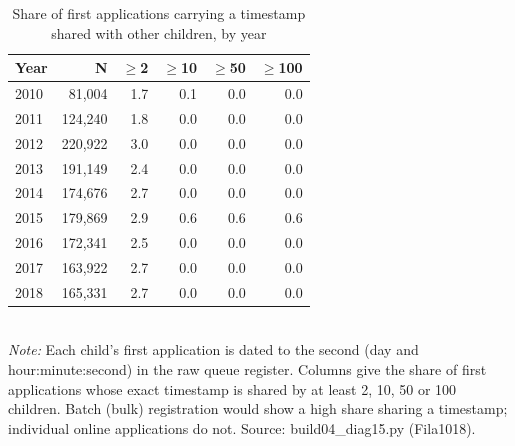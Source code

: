 \begin{table}[htbp]\centering
\caption{Share of first applications carrying a timestamp shared with other children, by year}
\label{tab:D15_B1_lote_share}
\small
\begin{tabular}{lrrrrr}
\toprule
Year & N & $\geq$2 & $\geq$10 & $\geq$50 & $\geq$100 \\
\midrule
2010 & 81,004 & 1.7 & 0.1 & 0.0 & 0.0 \\
2011 & 124,240 & 1.8 & 0.0 & 0.0 & 0.0 \\
2012 & 220,922 & 3.0 & 0.0 & 0.0 & 0.0 \\
2013 & 191,149 & 2.4 & 0.0 & 0.0 & 0.0 \\
2014 & 174,676 & 2.7 & 0.0 & 0.0 & 0.0 \\
2015 & 179,869 & 2.9 & 0.6 & 0.6 & 0.6 \\
2016 & 172,341 & 2.5 & 0.0 & 0.0 & 0.0 \\
2017 & 163,922 & 2.7 & 0.0 & 0.0 & 0.0 \\
2018 & 165,331 & 2.7 & 0.0 & 0.0 & 0.0 \\
\bottomrule
\end{tabular}
\\[3pt]{\footnotesize \textit{Note:} Each child's first application is dated to the second (day and hour:minute:second) in the raw queue register. Columns give the share of first applications whose exact timestamp is shared by at least 2, 10, 50 or 100 children. Batch (bulk) registration would show a high share sharing a timestamp; individual online applications do not. Source: build04\_diag15.py (Fila1018).}
\end{table}
